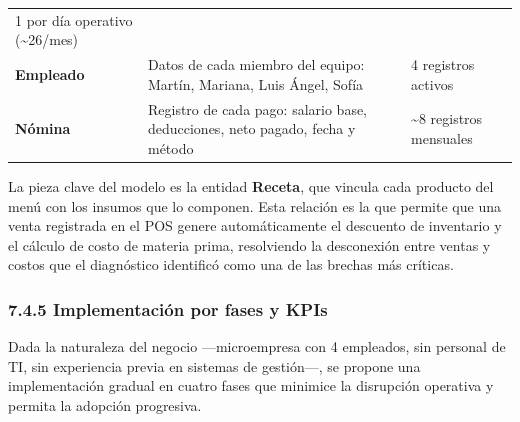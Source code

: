 \documentclass[
  12pt,
  spanish,
]{article}
\begin{document}
\begin{longtable}[]{@{}lll@{}}
\begin{minipage}[t]{0.30\columnwidth}
1 por día operativo (\textasciitilde26/mes)\strut
\end{minipage}\tabularnewline
\begin{minipage}[t]{0.30\columnwidth}\raggedright
\textbf{Empleado}\strut
\end{minipage} & \begin{minipage}[t]{0.30\columnwidth}\raggedright
Datos de cada miembro del equipo: Martín, Mariana, Luis Ángel,
Sofía\strut
\end{minipage} & \begin{minipage}[t]{0.30\columnwidth}\raggedright
4 registros activos\strut
\end{minipage}\tabularnewline
\begin{minipage}[t]{0.30\columnwidth}\raggedright
\textbf{Nómina}\strut
\end{minipage} & \begin{minipage}[t]{0.30\columnwidth}\raggedright
Registro de cada pago: salario base, deducciones, neto pagado, fecha y
método\strut
\end{minipage} & \begin{minipage}[t]{0.30\columnwidth}\raggedright
\textasciitilde8 registros mensuales\strut
\end{minipage}\tabularnewline
\bottomrule
\end{longtable}

La pieza clave del modelo es la entidad \textbf{Receta}, que vincula
cada producto del menú con los insumos que lo componen. Esta relación es
la que permite que una venta registrada en el POS genere automáticamente
el descuento de inventario y el cálculo de costo de materia prima,
resolviendo la desconexión entre ventas y costos que el diagnóstico
identificó como una de las brechas más críticas.

\hypertarget{implementaciuxf3n-por-fases-y-kpis}{%
\subsubsection{7.4.5 Implementación por fases y
KPIs}\label{implementaciuxf3n-por-fases-y-kpis}}

Dada la naturaleza del negocio ---microempresa con 4 empleados, sin
personal de TI, sin experiencia previa en sistemas de gestión---, se
propone una implementación gradual en cuatro fases que minimice la
disrupción operativa y permita la adopción progresiva.
\end{document}
